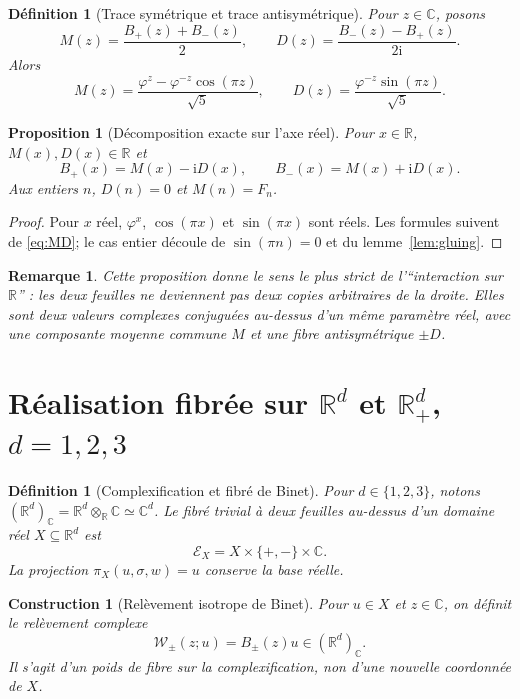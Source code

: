 \documentclass[11pt,a4paper]{article}
\newtheorem{proposition}[theorem]{Proposition}
\newtheorem{definition}[theorem]{Définition}
\newtheorem{construction}[theorem]{Construction}
\newtheorem{remark}[theorem]{Remarque}
\newcommand{\R}{\mathbb R}
\newcommand{\C}{\mathbb C}
\newcommand{\Rp}{\mathbb R_{+}}
\newcommand{\ii}{\mathrm i}
\newcommand{\ph}{\varphi}
\begin{document}
\begin{definition}[Trace symétrique et trace antisymétrique]
Pour $z\in\C$, posons
\[
 M(z)=\frac{B_+(z)+B_-(z)}2,
 \qquad
 D(z)=\frac{B_-(z)-B_+(z)}{2\ii}.
\]
Alors
\begin{equation}\label{eq:MD}
 M(z)=\frac{\ph^z-\ph^{-z}\cos(\pi z)}{\sqrt5},
 \qquad
 D(z)=\frac{\ph^{-z}\sin(\pi z)}{\sqrt5}.
\end{equation}
\end{definition}

\begin{proposition}[Décomposition exacte sur l'axe réel]\label{prop:realaxis}
Pour $x\in\R$, $M(x),D(x)\in\R$ et
\[
 B_+(x)=M(x)-\ii D(x),\qquad
 B_-(x)=M(x)+\ii D(x).
\]
Aux entiers $n$, $D(n)=0$ et $M(n)=F_n$.
\end{proposition}

\begin{proof}
Pour $x$ réel, $\ph^x$, $\cos(\pi x)$ et $\sin(\pi x)$ sont réels. Les formules suivent de \eqref{eq:MD}; le cas entier découle de $\sin(\pi n)=0$ et du lemme~\ref{lem:gluing}.
\end{proof}

\begin{remark}
Cette proposition donne le sens le plus strict de l'``interaction sur $\R$'' : les deux feuilles ne deviennent pas deux copies arbitraires de la droite. Elles sont deux valeurs complexes conjuguées au-dessus d'un même paramètre réel, avec une composante moyenne commune $M$ et une fibre antisymétrique $\pm D$.
\end{remark}

\section{Réalisation fibrée sur $\R^d$ et $\Rp^d$, $d=1,2,3$}

\begin{definition}[Complexification et fibré de Binet]
Pour $d\in\{1,2,3\}$, notons $(\R^d)_\C=\R^d\otimes_\R\C\simeq\C^d$. Le fibré trivial à deux feuilles au-dessus d'un domaine réel $X\subseteq\R^d$ est
\[
 \mathcal E_X=X\times\{+,-\}\times\C.
\]
La projection $\pi_X(u,\sigma,w)=u$ conserve la base réelle.
\end{definition}

\begin{construction}[Relèvement isotrope de Binet]\label{cons:lift}
Pour $u\in X$ et $z\in\C$, on définit le relèvement complexe
\[
 \mathcal W_\pm(z;u)=B_\pm(z)u\in(\R^d)_\C.
\]
Il s'agit d'un poids de fibre sur la complexification, non d'une nouvelle coordonnée de $X$.
\end{construction}
\end{document}
